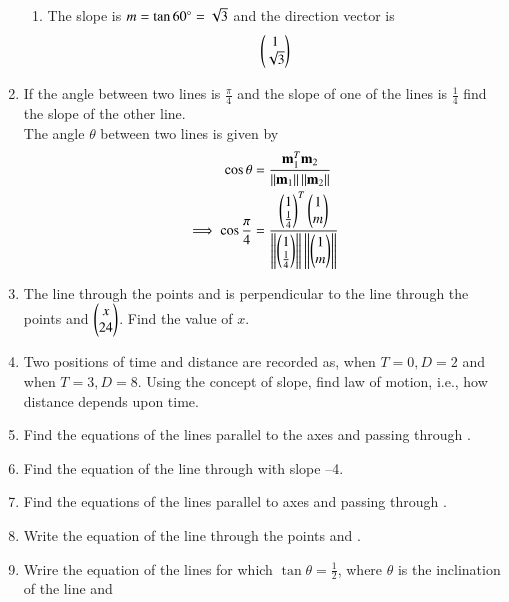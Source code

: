 \begin{enumerate}[label=\arabic*.,ref=\thesubsection.\theenumi]
\begin{enumerate}
%
\item The slope is $m = \tan 60 \degree = \sqrt{3}$ and the  direction vector is
\begin{align}
\begin{pmatrix}1\\\sqrt{3}\end{pmatrix}
\end{align}
\end{enumerate}
\item If the angle between two lines is $\frac{\pi}{4}$ and the slope of one of the lines is $\frac{1}{4}$ find the slope of the other line.
\\
\solution The angle $\theta$ between two lines is given by 
%
\begin{align}
\cos \theta &= \frac{\mathbf{m}_1^T\mathbf{m}_2}{\left\lVert\mathbf{m}_1\right\rVert\left\lVert\mathbf{m}_2\right\rVert}
\\
\implies \cos \frac{\pi}{4} &= \frac{\begin{pmatrix}1\\\frac{1}{4}\end{pmatrix}^T\begin{pmatrix}1\\m\end{pmatrix}}{\left\lVert\begin{pmatrix}1\\\frac{1}{4}\end{pmatrix}\right\rVert\left\lVert\begin{pmatrix}1\\m\end{pmatrix}\right\rVert}
\end{align}
%
\item The line through the points  and  is perpendicular to the line through the points  and $\begin{pmatrix}x\\24\end{pmatrix}$.  Find the value of $x$.
\item Two positions of time and distance are recorded as, when $T = 0, D = 2$ and when $T = 3, D = 8$. Using the concept of slope, find law of motion, i.e., how distance depends upon time.
\item Find the equations of the lines parallel to the axes and passing through .
\item Find the equation of the line through  with slope –4.
\item Find the equations of the lines parallel to axes and passing through .
\item Write the equation of the line through the points  and .
\item Wrire the equation of the lines for which $\tan \theta = \frac{1}{2}$, where $\theta$ is the inclination of the line and 

\end{enumerate}
